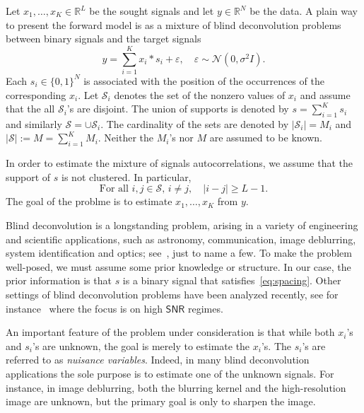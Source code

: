 \documentclass[english,11pt]{article}
\numberwithin{equation}{section}
\theoremstyle{plain}
\theoremstyle{definition}
\theoremstyle{remark}
\theoremstyle{plain}
\theoremstyle{remark}
\theoremstyle{plain}
\theoremstyle{plain}
\newcommand{\RL}{\mathbb{R}^L}
\newcommand{\RN}{\mathbb{R}^N}
\newcommand{\SNR}{{\textsf{SNR}}}
\begin{document}
Let $x_1,\ldots,x_K\in\RL$ be the sought signals and let $y\in\RN$ be the data. 
A plain way to present the forward model is as a mixture of blind deconvolution problems between binary signals and the target signals
\begin{equation} \label{eq:model}
y = \sum_{i=1}^K x_i\ast s_i + \varepsilon,\quad \varepsilon\sim\mathcal{N}(0,\sigma^2 I).
\end{equation}
Each  $s_i\in\{0,1\}^N$ is associated with the position of the occurrences of the corresponding $x_i$. Let $\mathcal{S}_i$ denotes the set of  the nonzero
 values of $x_i$ and assume that the all $\mathcal{S}_i$'s are disjoint. The union of supports is denoted by $s = \sum_{i=1}^Ks_i$ and similarly $\mathcal{S} = \cup \mathcal{S}_i$. 
The cardinality of the sets are denoted by $\vert \mathcal{S}_i\vert = M_i$ and $\vert \mathcal{S}\vert :=M =  \sum_{i=1}^{K}M_i$.  Neither the $M_i$'s nor $M$ are assumed to be known. 

In order to estimate the mixture of signals autocorrelations, we assume that the support of $s$ is not clustered. In particular, 
\begin{equation} \label{eq:spacing}
\text{For all }  i,j\in\mathcal{S}, \, i\neq j,  \quad  \vert i-j \vert\geq L-1.  
\end{equation}
The goal of the problme is to estimate $x_1,\ldots,x_K$ from $y$.

Blind deconvolution is a longstanding problem, arising in a variety of engineering and scientific applications, such as astronomy, communication, image deblurring, system identification and optics; see~\cite{jefferies1993restoration,shalvi1990new,ayers1988iterative,abed1997blind}, just to name a few. 
To make the problem well-posed, we must  assume some prior knowledge or  structure. 
In our case, the prior information is that $s$ is a binary signal that satisfies~\eqref{eq:spacing}. 
Other settings of blind deconvolution problems have been analyzed recently, see for instance~\cite{ahmed2014blind,li2016identifiability,li2016rapid,ling2015self,ling2017blind,chi2016guaranteed}
where the focus is on high $\SNR$ regimes.


An important feature of the problem under consideration is that while both $x_i$'s and $s_i$'s are unknown, the goal is merely to estimate the $x_i$'s. The  $s_i$'s  are referred to as \emph{nuisance  variables}. Indeed, in many blind deconvolution applications the sole purpose is to estimate one of the unknown signals. For instance, in image deblurring, both the blurring
kernel and the high-resolution image are unknown, but the primary goal is only
to sharpen the image.
\end{document}
